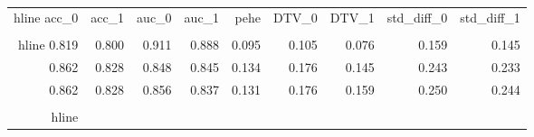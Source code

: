 \begin{table}[h]
\centering
\caption{}
\label{wd_para_0.0_wd_24.286033630371094}
\begin{tabular}{rrrrrrrrr}
\\hline
 acc\_0 &  acc\_1 &  auc\_0 &  auc\_1 &  pehe &  DTV\_0 &  DTV\_1 &  std\_diff\_0 &  std\_diff\_1 \\
\\hline
 0.819 &  0.800 &  0.911 &  0.888 & 0.095 &  0.105 &  0.076 &       0.159 &       0.145 \\
 0.862 &  0.828 &  0.848 &  0.845 & 0.134 &  0.176 &  0.145 &       0.243 &       0.233 \\
 0.862 &  0.828 &  0.856 &  0.837 & 0.131 &  0.176 &  0.159 &       0.250 &       0.244 \\
\\hline
\end{tabular}
\end{table}
